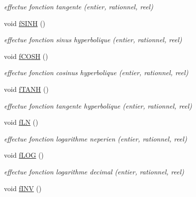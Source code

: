 \begin{DoxyCompactItemize}
\begin{DoxyCompactList}\small\item\em effectue fonction tangente (entier, rationnel, reel) \end{DoxyCompactList}\item 
\hypertarget{class_pile_aef8fca3177bec1021a5f85de9df3cfa2}{void \hyperlink{class_pile_aef8fca3177bec1021a5f85de9df3cfa2}{f\-S\-I\-N\-H} ()}\label{class_pile_aef8fca3177bec1021a5f85de9df3cfa2}

\begin{DoxyCompactList}\small\item\em effectue fonction sinus hyperbolique (entier, rationnel, reel) \end{DoxyCompactList}\item 
\hypertarget{class_pile_a41920a6c8810da368b65d74ccab119bc}{void \hyperlink{class_pile_a41920a6c8810da368b65d74ccab119bc}{f\-C\-O\-S\-H} ()}\label{class_pile_a41920a6c8810da368b65d74ccab119bc}

\begin{DoxyCompactList}\small\item\em effectue fonction cosinus hyperbolique (entier, rationnel, reel) \end{DoxyCompactList}\item 
\hypertarget{class_pile_a3502ad2b3d47c01fed500f45a63d73aa}{void \hyperlink{class_pile_a3502ad2b3d47c01fed500f45a63d73aa}{f\-T\-A\-N\-H} ()}\label{class_pile_a3502ad2b3d47c01fed500f45a63d73aa}

\begin{DoxyCompactList}\small\item\em effectue fonction tangente hyperbolique (entier, rationnel, reel) \end{DoxyCompactList}\item 
\hypertarget{class_pile_ac2dbfceac12846d16ab86225e5f95e19}{void \hyperlink{class_pile_ac2dbfceac12846d16ab86225e5f95e19}{f\-L\-N} ()}\label{class_pile_ac2dbfceac12846d16ab86225e5f95e19}

\begin{DoxyCompactList}\small\item\em effectue fonction logarithme neperien (entier, rationnel, reel) \end{DoxyCompactList}\item 
\hypertarget{class_pile_afb45811f5a215c144bff16598c5e8054}{void \hyperlink{class_pile_afb45811f5a215c144bff16598c5e8054}{f\-L\-O\-G} ()}\label{class_pile_afb45811f5a215c144bff16598c5e8054}

\begin{DoxyCompactList}\small\item\em effectue fonction logarithme decimal (entier, rationnel, reel) \end{DoxyCompactList}\item 
\hypertarget{class_pile_ab832ceba68c7a40cc5bd40045dca3dce}{void \hyperlink{class_pile_ab832ceba68c7a40cc5bd40045dca3dce}{f\-I\-N\-V} ()}\label{class_pile_ab832ceba68c7a40cc5bd40045dca3dce}


\end{DoxyCompactItemize}

